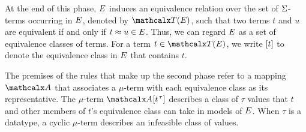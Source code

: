 At the end of this phase, $E$ induces an equivalence
relation over the set of $\mathrm{\Sigma}$-terms occurring in $E$,
denoted by $\tEc$, such that two terms $t$ and $u$ are equivalent if and
only if $t \approx u \in E$.
Thus, we can regard $E$ as a set of
equivalence classes of terms. For a term $t \in \tEc$, we write $[t]$ to
denote the equivalence class in $E$ that contains $t$.

The premises of the rules that make up the second phase refer to a mapping $\Val$
that associates a $\mu$-term with each equivalence class as its representative.
The $\mu$-term $\Val[t\typ{\tau}]$ describes a class of $\tau$ values
that $t$ and other members of $t$'s equivalence class can take in models of $E$.
When $\tau$ is a datatype, %
a cyclic $\mu$-term describes an infeasible class of values.

